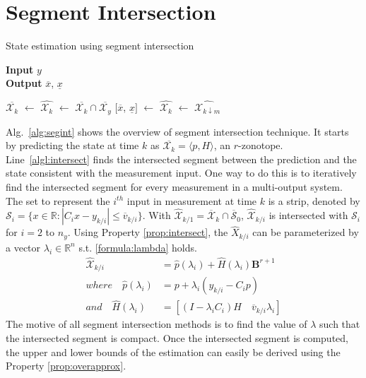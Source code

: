 \section{Segment Intersection} 
\begin{algorithm}[H]
        \caption{State estimation using segment intersection}
        \textbf{Input} $y$\\
 		\textbf{Output} $\overline{x}$, $\underline{x}$
        \begin{algorithmic}[1]
        \State $\overline{\mathcal{X}_k}$ $\gets$ 
        \State $\hat{\mathcal{X}_{k}}$ $\gets$ $\overline{\mathcal{X}_k} \cap \overline{\mathcal{X}_y}$ \label{algl:intersect}
        \State $[\overline{x}$, $\underline{x}]$ $\gets$ 
        \State $\hat{\mathcal{X}_{k}}$ $\gets$ $\hat{\mathcal{X}_{k\downarrow m}}$ \label{algl:reduce}
        \end{algorithmic}
        \label{alg:segint}
\end{algorithm}
Alg.~\ref{alg:segint} shows the overview of segment intersection technique. It starts by predicting the state at time $k$ as $\overline{\mathcal{X}_k} = \langle p , H \rangle $, an $r$-zonotope. Line~\ref{algl:intersect} finds the intersected segment between the prediction and the state consistent with the measurement input. One way to do this is to iteratively find the intersected segment for every measurement in a multi-output system. The set to represent the $i^{th}$ input in measurement at time $k$  is a strip, denoted by $\mathscr{S}_i = \{x \in \mathbb{R} : |C_i x - y_{k/i}| \leq \overline{v}_{k/i}\}$. With $\hat{\mathcal{X}}_{k/1} = \overline{\mathcal{X}}_k \cap \overline{\mathscr{S}}_0$, $\hat{\mathcal{X}}_{k/i}$  is intersected with $\mathscr{S}_i$ for $i=2$ to $n_y$. Using Property \ref{prop:intersect}, the $\hat{X}_{k/i}$ can be parameterized by a vector $\lambda_i \in \mathbb{R}^n$ s.t. \eqref{formula:lambda} holds.
\begin{equation}
\label{formula:lambda}
\begin{split}
\mathcal{\hat{X}}_{k/i} &= \hat{p}(\lambda_i) + \hat{H}(\lambda_i)\textbf{B}^{r+1}  \\
where \quad \hat{p}(\lambda_i) &= p+ \lambda_i(y_{k/i} - C_i p)\\
and \quad \hat{H}(\lambda_i) &= [(I- \lambda_i C_i) H \quad \overline{v}_{k/i} \lambda_i ]
\end{split}
\end{equation}
The motive of all segment intersection methods is to find the value of $\lambda$ such that the intersected segment is compact. Once the intersected segment is computed, the upper and lower bounds of the estimation can easily be derived using the Property \ref{prop:overapprox}.

